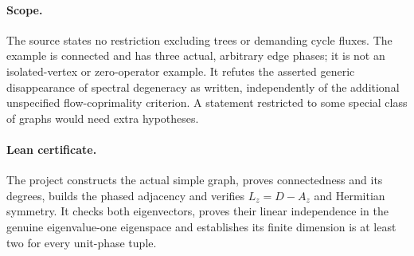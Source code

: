 \documentclass[11pt]{article}
\begin{document}
\paragraph{Scope.}
The source states no restriction excluding trees or demanding cycle fluxes.
The example is connected and has three actual, arbitrary edge phases; it
is not an isolated-vertex or zero-operator example. It refutes the asserted
generic disappearance of spectral degeneracy as written, independently
of the additional unspecified flow-coprimality criterion. A statement
restricted to some special class of graphs would need extra hypotheses.

\paragraph{Lean certificate.}
The project constructs the actual simple graph, proves connectedness and
its degrees, builds the phased adjacency and verifies $L_z=D-A_z$ and
Hermitian symmetry. It checks both eigenvectors, proves their linear
independence in the genuine eigenvalue-one eigenspace and establishes its
finite dimension is at least two for every unit-phase tuple.
\end{document}
